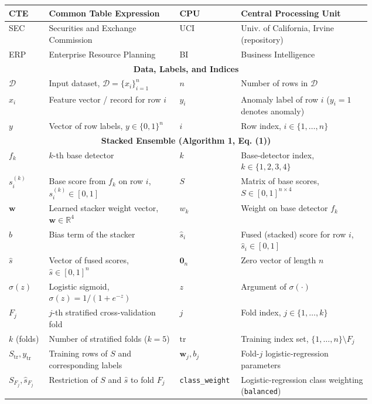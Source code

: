 \documentclass{ieeeaccess}
\begin{document}
\begin{table}[tp]
\begin{tabular}{|l|p{0.36\linewidth}||l|p{0.36\linewidth}|}
CTE   & Common Table Expression              & CPU  & Central Processing Unit \\ \hline
SEC   & Securities and Exchange Commission   & UCI  & Univ. of California, Irvine (repository) \\ \hline
ERP   & Enterprise Resource Planning         & BI   & Business Intelligence \\ \hline
\multicolumn{4}{|c|}{\textbf{Data, Labels, and Indices}} \\
\hline
$\mathcal{D}$ & Input dataset, $\mathcal{D}=\{x_i\}_{i=1}^{n}$ &
$n$ & Number of rows in $\mathcal{D}$ \\ \hline
$x_i$ & Feature vector / record for row $i$ &
$y_i$ & Anomaly label of row $i$ ($y_i=1$ denotes anomaly) \\ \hline
$y$ & Vector of row labels, $y\in\{0,1\}^{n}$ &
$i$ & Row index, $i\in\{1,\dots,n\}$ \\ \hline
\multicolumn{4}{|c|}{\textbf{Stacked Ensemble (Algorithm 1, Eq. (1))}} \\
\hline
$f_k$ & $k$-th base detector &
$k$ & Base-detector index, $k\in\{1,2,3,4\}$ \\ \hline
$s_i^{(k)}$ & Base score from $f_k$ on row $i$, $s_i^{(k)}\in[0,1]$ &
$S$ & Matrix of base scores, $S\in[0,1]^{n\times 4}$ \\ \hline
$\mathbf{w}$ & Learned stacker weight vector, $\mathbf{w}\in\mathbb{R}^{4}$ &
$w_k$ & Weight on base detector $f_k$ \\ \hline
$b$ & Bias term of the stacker &
$\hat{s}_i$ & Fused (stacked) score for row $i$, $\hat{s}_i\in[0,1]$ \\ \hline
$\hat{s}$ & Vector of fused scores, $\hat{s}\in[0,1]^{n}$ &
$\mathbf{0}_n$ & Zero vector of length $n$ \\ \hline
$\sigma(z)$ & Logistic sigmoid, $\sigma(z)=1/(1+e^{-z})$ &
$z$ & Argument of $\sigma(\cdot)$ \\ \hline
$F_j$ & $j$-th stratified cross-validation fold &
$j$ & Fold index, $j\in\{1,\dots,k\}$ \\ \hline
$k$ (folds) & Number of stratified folds ($k=5$) &
$\mathrm{tr}$ & Training index set, $\{1,\dots,n\}\setminus F_j$ \\ \hline
$S_{\mathrm{tr}}, y_{\mathrm{tr}}$ & Training rows of $S$ and corresponding labels &
$\mathbf{w}_j, b_j$ & Fold-$j$ logistic-regression parameters \\ \hline
$S_{F_j}, \hat{s}_{F_j}$ & Restriction of $S$ and $\hat{s}$ to fold $F_j$ &
\texttt{class\_weight} & Logistic-regression class weighting (\texttt{balanced}) \\ \hline

\end{tabular}
\end{table}
\end{document}
